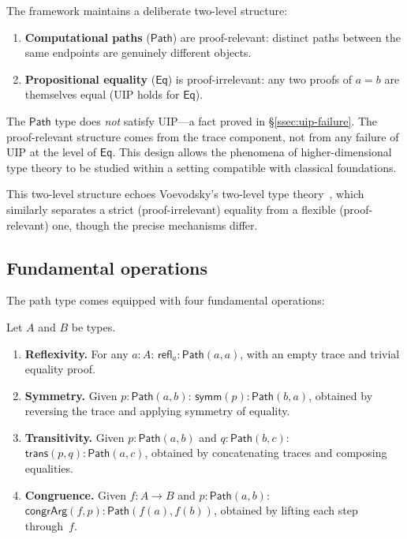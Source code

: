 \documentclass[manuscript]{BSLstyle}
\newcommand{\Path}{\mathsf{Path}}
\newcommand{\Eq}{\mathsf{Eq}}
\newcommand{\refl}{\mathsf{refl}}
\newcommand{\symm}{\mathsf{symm}}
\newcommand{\trans}{\mathsf{trans}}
\newcommand{\congrArg}{\mathsf{congrArg}}
\begin{document}
\begin{remark}\label{rem:two-level}
The framework maintains a deliberate two-level structure:
\begin{enumerate}
\item \textbf{Computational paths} ($\Path$) are proof-relevant: distinct
  paths between the same endpoints are genuinely different objects.
\item \textbf{Propositional equality} ($\Eq$) is proof-irrelevant: any
  two proofs of $a = b$ are themselves equal (UIP holds for $\Eq$).
\end{enumerate}
The $\Path$ type does \emph{not} satisfy UIP---a fact proved in
\S\ref{ssec:uip-failure}.  The proof-relevant structure comes from the
trace component, not from any failure of UIP at the level of $\Eq$.
This design allows the phenomena of higher-dimensional type theory to
be studied within a setting compatible with classical foundations.

This two-level structure echoes Voevodsky's two-level type theory~\cite{Voevodsky2013,AnnenkovCapriottiKrausSattler2023},
which similarly separates a strict (proof-irrelevant) equality from a
flexible (proof-relevant) one, though the precise mechanisms differ.
\end{remark}

\subsection{Fundamental operations}

The path type comes equipped with four fundamental operations:

\begin{definition}\label{def:path-ops}
Let $A$ and $B$ be types.
\begin{enumerate}[label=(\roman*)]
\item \textbf{Reflexivity.}  For any $a : A$:
  $\refl_a : \Path(a, a)$,
  with an empty trace and trivial equality proof.

\item \textbf{Symmetry.}  Given $p : \Path(a, b)$:
  $\symm(p) : \Path(b, a)$,
  obtained by reversing the trace and applying symmetry of equality.

\item \textbf{Transitivity.}  Given $p : \Path(a, b)$ and
  $q : \Path(b, c)$:
  $\trans(p, q) : \Path(a, c)$,
  obtained by concatenating traces and composing equalities.

\item \textbf{Congruence.}  Given $f : A \to B$ and $p : \Path(a, b)$:
  $\congrArg(f, p) : \Path(f(a), f(b))$,
  obtained by lifting each step through~$f$.
\end{enumerate}
\end{definition}
\end{document}
